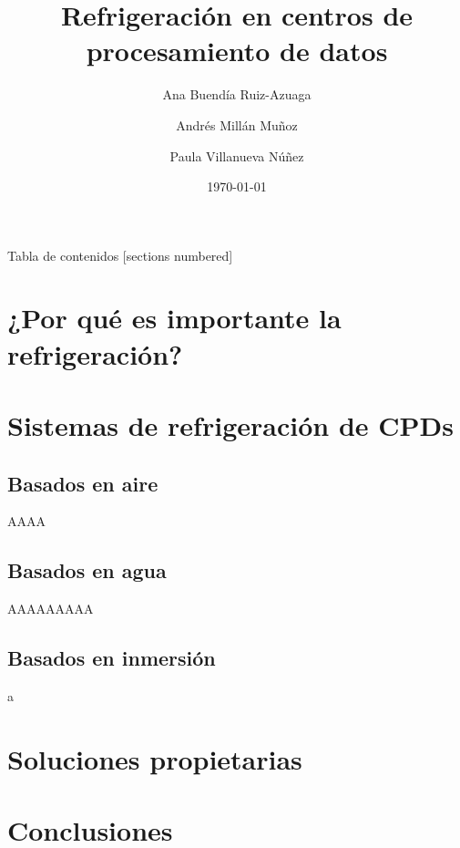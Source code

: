 \documentclass[aspectratio=169, compress]{beamer}
\title{Refrigeración en centros de procesamiento de datos}
\date{\today}
\author{Ana Buendía Ruiz-Azuaga \and Andrés Millán Muñoz \and Paula Villanueva Núñez}
\institute{Universidad de Granada}
\begin{document}
\maketitle

\begin{frame}{Tabla de contenidos}
    [sections numbered]
    \tableofcontents
\end{frame}

\section{¿Por qué es importante la refrigeración?}    %

\section{Sistemas de refrigeración de CPDs}

\subsection{Basados en aire}

\begin{frame}[fragile]
    AAAA
\end{frame}

\subsection{Basados en agua}

\begin{frame}
    AAAAAAAAA
\end{frame}


\subsection{Basados en inmersión}

\begin{frame}
    a
\end{frame}


\section{Soluciones propietarias}

\section{Conclusiones}
\end{document}
